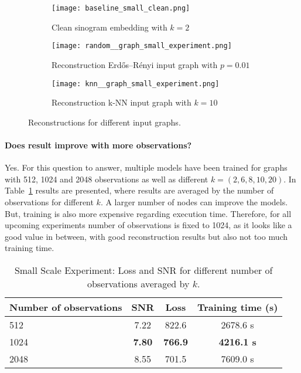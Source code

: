 \begin{figure}[H]
  \captionsetup[subfigure]{justification=centering}
  \centering
  \begin{subfigure}[t]{0.3\textwidth}
      \texttt{[image: baseline\_small\_clean.png]}
      \caption{Clean sinogram embedding with $k=2$}
      \label{fig:small_experiment_clean2}
  \end{subfigure}\hfill
  \begin{subfigure}[t]{0.3\textwidth}
    \texttt{[image: random\_\_graph\_small\_experiment.png]}
    \caption{Reconstruction Erdős–Rényi input graph with $p=0.01$}
    \label{fig:small_experiment_random_graph}
  \end{subfigure}\hfill
  \begin{subfigure}[t]{0.3\textwidth}
    \texttt{[image: knn\_\_graph\_small\_experiment.png]}
    \caption{Reconstruction k-NN input graph with $k=10$}
    \label{fig:small_experiment_knn_graph}
  \end{subfigure}
  \caption{Reconstructions for different input graphs.}
  \label{fig:input_graph_small}
\end{figure}

\clearpage

  \paragraph{Does result improve with more observations?}
  Yes.
  For this question to answer, multiple models have been trained for graphs with 512, 1024 and 2048 observations
  as well as different $k = (2,6,8,10,20)$.
  In Table~\ref{tab:graph_knn} results are presented, where results are averaged by the number of observations 
  for different $k$.
  A larger number of nodes can improve the models. 
  But, training is also more expensive regarding execution time. 
  Therefore, for all upcoming experiments number of observations is fixed to 1024, as it looks like a good
  value in between, with good reconstruction results but also not too much training time.
  
  \begin{table}[H]
    \centering
      \begin{tabular}{l|ccc}
      \toprule
      \small \textbf{Number of observations} & \small \textbf{SNR} & \small \textbf{Loss} & \textbf{Training time (s)}  \\ 
      \midrule
      512  &  7.22    &  822.6  & 2678.6 s \\ \hline
      1024 &  \textbf{7.80}    & \textbf{ 766.9}  & \textbf{4216.1 s} \\ \hline
      2048 &  8.55    &  701.5  & 7609.0 s  \\ \hline
      \midrule
      \end{tabular}
    \caption{Small Scale Experiment: Loss and SNR for different number of observations averaged by $k$.}
    \label{tab:graph_knn}
  \end{table}

